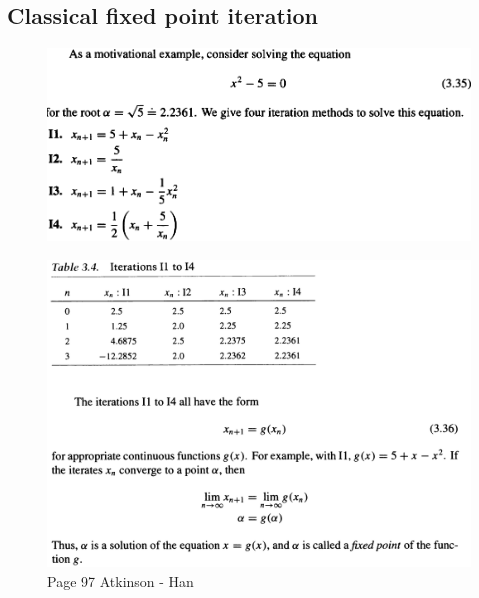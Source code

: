 \documentclass[12pt]{article}
\theoremstyle{theorem}
\begin{document}
\subsection{Classical fixed point iteration}

\begin{figure}[h!]
\centering
\includegraphics[scale=0.55]{Figures/screenshot005}
\label{fig:screenshot005}
\end{figure}

\begin{figure}[h!]
	\centering
	\includegraphics[scale=1.1]{Figures/screenshot006}
	\caption{Page 97 Atkinson - Han}
	\label{fig:screenshot005}
\end{figure}
\end{document}
